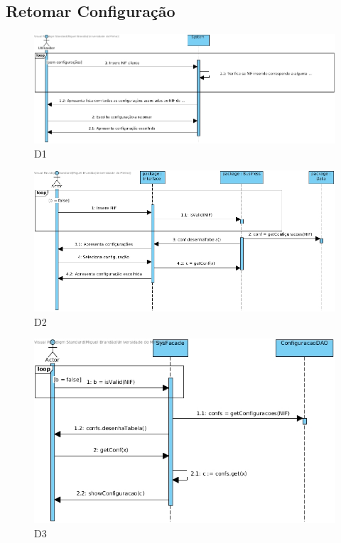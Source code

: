 \subsection{Retomar Configuração}

\begin{figure}[H]
    \centering
    \includegraphics[width=\textwidth]{diagramas_de_sequencia/imgs/UserSystemUC6D1.jpg}
    \caption{D1}
\end{figure}
\begin{figure}[H]
    \centering
    \includegraphics[width=\textwidth]{diagramas_de_sequencia/imgs/UserSystemUC6D2.jpg}
    \caption{D2}
\end{figure}
\begin{figure}[H]
    \centering
    \includegraphics[width=\textwidth]{diagramas_de_sequencia/imgs/UserSystemUC6D3.jpg}
    \caption{D3}
\end{figure}
